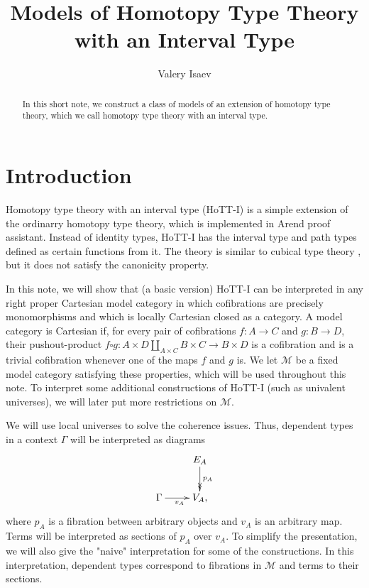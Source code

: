 \documentclass{amsart}
\theoremstyle{definition}
\theoremstyle{remark}
\numberwithin{figure}{section}
\begin{document}
\title{Models of Homotopy Type Theory with an Interval Type}

\author{Valery Isaev}

\begin{abstract}
In this short note, we construct a class of models of an extension of homotopy type theory, which we call homotopy type theory with an interval type.
\end{abstract}

\maketitle

\section{Introduction}

Homotopy type theory with an interval type (HoTT-I) is a simple extension of the ordinarry homotopy type theory, which is implemented in Arend proof assistant.
Instead of identity types, HoTT-I has the interval type and path types defined as certain functions from it.
The theory is similar to cubical type theory \cite{cubical-tt}, but it does not satisfy the canonicity property.

In this note, we will show that (a basic version) HoTT-I can be interpreted in any right proper Cartesian model category in which cofibrations are precisely monomorphisms and which is locally Cartesian closed as a category.
A model category is Cartesian if, for every pair of cofibrations $f : A \to C$ and $g : B \to D$, their pushout-product $f \square g : A \times D \amalg_{A \times C} B \times C \to B \times D$ is a cofibration and is a trivial cofibration whenever one of the maps $f$ and $g$ is.
We let $\mathcal{M}$ be a fixed model category satisfying these properties, which will be used throughout this note.
To interpret some additional constructions of HoTT-I (such as univalent universes), we will later put more restrictions on $\mathcal{M}$.

We will use local universes \cite{local-universes} to solve the coherence issues.
Thus, dependent types in a context $\Gamma$ will be interpreted as diagrams
\[ \xymatrix{                     & E_A \ar@{->>}[d]^{p_A} \\
              \Gamma \ar[r]_{v_A} & V_A,
            } \]
where $p_A$ is a fibration between arbitrary objects and $v_A$ is an arbitrary map.
Terms will be interpreted as sections of $p_A$ over $v_A$.
To simplify the presentation, we will also give the "naive" interpretation for some of the constructions.
In this interpretation, dependent types correspond to fibrations in $\mathcal{M}$ and terms to their sections.
\end{document}
